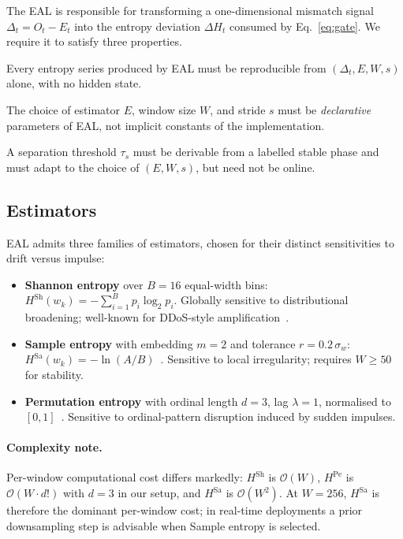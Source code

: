 \documentclass[futureinternet,article,submit,pdftex,moreauthors]{Definitions/mdpi}
\newcommand{\Hsh}{\ensuremath{H^{\mathrm{Sh}}}}
\newcommand{\Hsa}{\ensuremath{H^{\mathrm{Sa}}}}
\newcommand{\Hpe}{\ensuremath{H^{\mathrm{Pe}}}}
\newcommand{\EntropyDeviation}{\ensuremath{\Delta H}}
\newcommand{\taus}{\ensuremath{\tau_{s}}}
\begin{document}
The EAL is responsible for transforming a one-dimensional mismatch
signal $\Delta_t = O_t - E_t$ into the entropy deviation $\EntropyDeviation_t$
consumed by Eq.~\eqref{eq:gate}. We require it to satisfy three
properties.

\begin{description}[leftmargin=*,style=nextline]
\item[P1 (Reproducibility).] Every entropy series produced by EAL must
be reproducible from $(\Delta_t, E, W, s)$ alone, with no hidden state.
\item[P2 (Parameter Awareness).] The choice of estimator $E$, window
size $W$, and stride $s$ must be \emph{declarative} parameters of EAL,
not implicit constants of the implementation.
\item[P3 (Calibrated Threshold).] A separation threshold $\taus$ must
be derivable from a labelled stable phase and must adapt to the choice
of $(E, W, s)$, but need not be online.
\end{description}

\subsection{Estimators}

EAL admits three families of estimators, chosen for their distinct
sensitivities to drift versus impulse:

\begin{itemize}[leftmargin=*]
  \item \textbf{Shannon entropy} over $B = 16$ equal-width bins:
        $\Hsh(w_k) = -\sum_{i=1}^B p_i \log_2 p_i$.
        Globally sensitive to distributional broadening; well-known for
        DDoS-style amplification~\cite{kitsune2018}.
  \item \textbf{Sample entropy} with embedding $m=2$ and tolerance
        $r = 0.2\,\sigma_w$: $\Hsa(w_k) = -\ln(A/B)$~\cite{pincus1991}.
        Sensitive to local irregularity; requires $W \geq 50$ for
        stability.
  \item \textbf{Permutation entropy} with ordinal length $d=3$, lag
        $\lambda=1$, normalised to $[0,1]$~\cite{bandt2002}.
        Sensitive to ordinal-pattern disruption induced by sudden
        impulses.
\end{itemize}

\paragraph{Complexity note.} Per-window computational cost differs
markedly: $\Hsh$ is $\mathcal{O}(W)$, $\Hpe$ is
$\mathcal{O}(W \cdot d!)$ with $d = 3$ in our setup, and $\Hsa$ is
$\mathcal{O}(W^{2})$. At $W = 256$, $\Hsa$ is therefore the dominant
per-window cost; in real-time deployments a prior downsampling step is
advisable when Sample entropy is selected.
\end{document}
